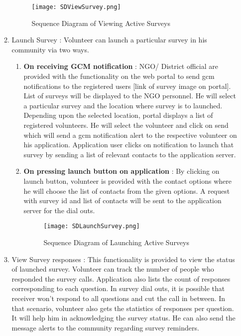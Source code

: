 \begin{itemize}
\begin{enumerate}
\begin{figure}[H]
    \centering
	\texttt{[image: SDViewSurvey.png]}
    \caption{ Sequence Diagram of Viewing Active Surveys}
    \label{fig:Sequence Diagram of Viewing Active Surveys}
\end{figure}

	\item{Launch Survey} : Volunteer can launch a particular survey in his community via two ways.
	
\begin{enumerate}
	\item\textbf{On receiving GCM notification} : NGO/ District official are provided with the functionality on the web portal to send gcm notifications to the registered users [link of survey image on portal]. List of surveys will be displayed to the NGO personnel. He will select a particular survey and the location where survey is to launched. Depending upon the selected location, portal displays a list of registered volunteers. He will select the volunteer and click on send which will send a gcm notification alert to the respective volunteer on his application. Application user clicks on notification to launch that survey by sending a list of relevant contacts to the application server.


	\item\textbf{On pressing launch button on application} : By clicking on launch button, volunteer is provided with the contact options where he will choose the list of contacts from the given options. A request with survey id and list of contacts  will be sent to the application server for the dial outs.

\begin{figure}[H]
    \centering
	\texttt{[image: SDLaunchSurvey.png]}
    \caption{ Sequence Diagram of Launching Active Surveys}
    \label{fig:Sequence Diagram of Launching Active Surveys}
\end{figure}
	\end{enumerate}


\item {View Survey responses} :  This functionality is provided to view the status of launched survey. Volunteer can track the number of people who responded the survey calls. Application also lists the count of responses corresponding to each question. In survey dial outs, it is possible that receiver won’t respond to all questions and cut the call in between.  In that scenario, volunteer also gets the statistics of responses per question. It will help him in acknowledging the survey status. He can also send the message alerts to the community regarding survey reminders. 
\end{enumerate}


\end{itemize}
